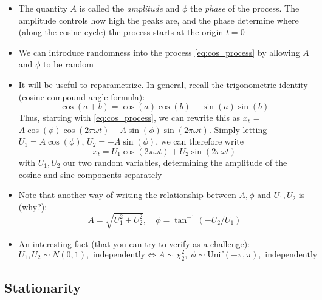\documentclass{article}
\begin{document}
\begin{itemize}
\item The quantity $A$ is called the \emph{amplitude} and $\phi$ the
  \emph{phase} of the process. The amplitude controls how high the peaks are, 
  and the phase determine where (along the cosine cycle) the process starts at
  the origin $t=0$   

\item We can introduce randomness into the process \eqref{eq:cos_process} by
  allowing $A$ and $\phi$ to be random

\item It will be useful to reparametrize. In general, recall the trigonometric
  identity (cosine compound angle formula):
  \begin{equation}
  \label{eq:compound_angle}
  \cos(a + b) = \cos(a) \cos(b) - \sin(a) \sin(b)
  \end{equation}
  Thus, starting with \eqref{eq:cos_process}, we can rewrite this as $x_t$ = $A
  \cos(\phi) \cos(2\pi\omega t) - A \sin(\phi) \sin(2\pi\omega t)$. Simply
  letting $U_1 = A \cos(\phi)$, $U_2 = -A \sin(\phi)$, we can therefore write   
  \begin{equation}
  \label{eq:cos_sin_process}
  x_t = U_1 \cos(2\pi\omega t) + U_2 \sin(2\pi\omega t)
  \end{equation}
  with $U_1, U_2$ our two random variables, determining the amplitude of the
  cosine and sine components separately

\item Note that another way of writing the relationship between $A,\phi$ and
  $U_1,U_2$ is (why?):
  \[
  A = \sqrt{U_1^2 + U_2^2}, \quad \phi = \tan^{-1}(-U_2/U_1)
  \]

  \item An interesting fact (that you can try to verify as a challenge): 
  \[
  U_1,U_2 \sim N(0,1), \text{ independently} \iff 
  A \sim \chi^2_2, \; \phi \sim \mathrm{Unif}(-\pi,\pi), \text{ independently} 
  \]
\end{itemize}

\subsection{Stationarity}
\end{document}
